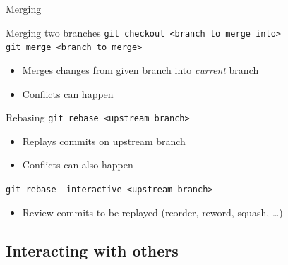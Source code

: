 \documentclass{beamer}
\begin{document}
\begin{frame}{Merging}
    \begin{block}{Merging two branches}
      \texttt{git checkout <branch to merge into>}\\
      \texttt{git merge <branch to merge>}
      \begin{itemize}
      \item Merges changes from given branch into \emph{current} branch
      \item Conflicts can happen
      \end{itemize}
    \end{block}
    \begin{block}{Rebasing}
      \texttt{git rebase <upstream branch>}
      \begin{itemize}
      \item Replays commits on upstream branch
      \item Conflicts can also happen
      \end{itemize}
      \texttt{git rebase --interactive <upstream branch>}
      \begin{itemize}
      \item Review commits to be replayed (reorder, reword, squash, \ldots)
      \end{itemize}
    \end{block}
\end{frame}

\subsection{Interacting with others}
\end{document}
